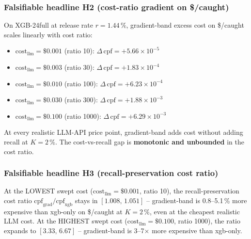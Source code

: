 \documentclass{article}
\begin{document}
\subsubsection{Falsifiable headline H2 (cost-ratio gradient on \$/caught)}
On XGB-24full at release rate $r{=}1.44\,\%$, gradient-band
excess cost on \$/caught scales linearly with cost ratio:
\begin{itemize}
  \item $\mathrm{cost}_{\mathrm{llm}}{=}\$0.001$ (ratio 10):
        $\Delta\,\mathrm{cpf}{=}+5.66{\times}10^{-5}$
  \item $\mathrm{cost}_{\mathrm{llm}}{=}\$0.003$ (ratio 30):
        $\Delta\,\mathrm{cpf}{=}+1.83{\times}10^{-4}$
  \item $\mathrm{cost}_{\mathrm{llm}}{=}\$0.010$ (ratio 100):
        $\Delta\,\mathrm{cpf}{=}+6.23{\times}10^{-4}$
  \item $\mathrm{cost}_{\mathrm{llm}}{=}\$0.030$ (ratio 300):
        $\Delta\,\mathrm{cpf}{=}+1.88{\times}10^{-3}$
  \item $\mathrm{cost}_{\mathrm{llm}}{=}\$0.100$ (ratio 1000):
        $\Delta\,\mathrm{cpf}{=}+6.29{\times}10^{-3}$
\end{itemize}
At every realistic LLM-API price point, gradient-band adds cost
without adding recall at $K{=}2\,\%$. The cost-vs-recall gap is
\textbf{monotonic and unbounded} in the cost ratio.

\subsubsection{Falsifiable headline H3 (recall-preservation cost ratio)}
At the LOWEST swept cost ($\mathrm{cost}_{\mathrm{llm}}{=}\$0.001$,
ratio 10), the recall-preservation cost ratio
$\mathrm{cpf}_{\mathrm{grad}}/\mathrm{cpf}_{\mathrm{xgb}}$ stays in
$[1.008,\,1.051]$ -- gradient-band is 0.8--5.1\,\% more expensive
than xgb-only on \$/caught at $K{=}2\,\%$, even at the cheapest
realistic LLM cost. At the HIGHEST swept cost
($\mathrm{cost}_{\mathrm{llm}}{=}\$0.100$, ratio 1000), the ratio
expands to $[3.33,\,6.67]$ -- gradient-band is 3--7$\times$ more
expensive than xgb-only.
\end{document}
